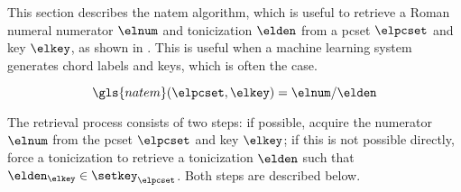 
This section describes the \gls{natem} algorithm, which is
useful to retrieve a Roman numeral numerator $\elnum$ and
tonicization $\elden$ from a \gls{pcset} $\elpcset$ and key
$\elkey$, as shown in . This is useful when a
machine learning system generates chord labels and keys,
which is often the case. 

\begin{equation}
    \label{eq:natem}
    \gls{natem}(\elpcset, \elkey) = \elnum\text{/}\elden
\end{equation}

The retrieval process consists of two steps: if possible,
acquire the numerator $\elnum$ from the \gls{pcset}
$\elpcset$ and key $\elkey$; if this is not possible
directly, force a tonicization to retrieve a tonicization
$\elden$ such that $\elden_\elkey \in \setkey_\elpcset$.
Both steps are described below.

